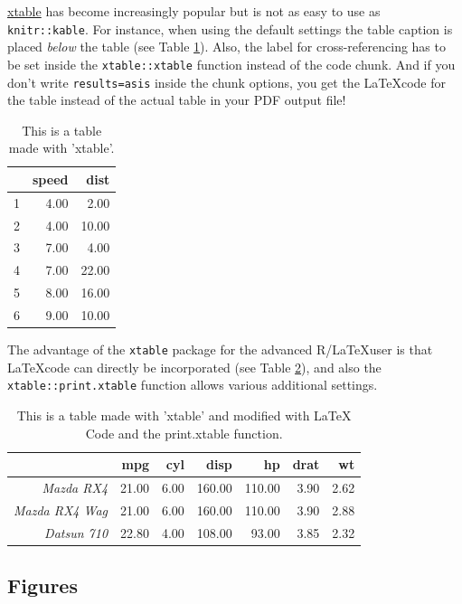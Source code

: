 \documentclass[a4paper,12pt]{article}
\begin{document}
\href{https://cran.r-project.org/web/packages/xtable/vignettes/xtableGallery.pdf}{xtable} has become increasingly popular but is not as easy to use as \texttt{knitr::kable}. For instance, when using the default settings the table caption is placed \emph{below} the table (see Table \ref{tab:xtable1}). Also, the label for cross-referencing has to be set inside the \texttt{xtable::xtable} function instead of the code chunk. And if you don't write \texttt{results=\textquotesingle{}asis\textquotesingle{}} inside the chunk options, you get the \LaTeX code for the table instead of the actual table in your PDF output file!
\begin{table}[ht]
\centering
\begin{tabular}{rrr}
  \hline
 & speed & dist \\ 
  \hline
1 & 4.00 & 2.00 \\ 
  2 & 4.00 & 10.00 \\ 
  3 & 7.00 & 4.00 \\ 
  4 & 7.00 & 22.00 \\ 
  5 & 8.00 & 16.00 \\ 
  6 & 9.00 & 10.00 \\ 
   \hline
\end{tabular}
\caption{This is a table made with 'xtable'.} 
\label{tab:xtable1}
\end{table}
The advantage of the \texttt{xtable} package for the advanced R/\LaTeX user is that \LaTeX code can directly be incorporated (see Table \ref{tab:xtable2}), and also the \texttt{xtable::print.xtable} function allows various additional settings.
\begin{table}[ht]
\centering
\caption{This is a table made with 'xtable' and modified with LaTeX Code and the print.xtable function.} 
\label{tab:xtable2}
\begin{tabular}{rrrrrrr}
  \toprule
 & {\Large{\bfseries{ mpg}}} & {\Large{\bfseries{ cyl}}} & {\Large{\bfseries{ disp}}} & {\Large{\bfseries{ hp}}} & {\Large{\bfseries{ drat}}} & {\Large{\bfseries{ wt}}} \\ 
  \midrule
{\emph{ Mazda RX4}} & 21.00 & 6.00 & 160.00 & 110.00 & 3.90 & 2.62 \\ 
  {\emph{ Mazda RX4 Wag}} & 21.00 & 6.00 & 160.00 & 110.00 & 3.90 & 2.88 \\ 
  {\emph{ Datsun 710}} & 22.80 & 4.00 & 108.00 & 93.00 & 3.85 & 2.32 \\ 
   \bottomrule
\end{tabular}
\end{table}
\hypertarget{figures}{%
\subsection{Figures}\label{figures}}
\end{document}
